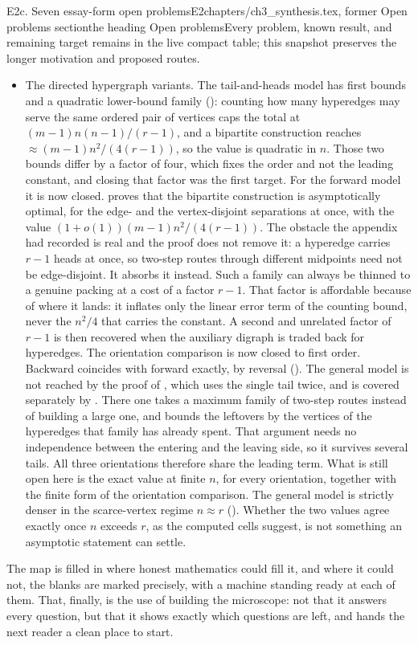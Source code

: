 \begin{offcut}{E2c. Seven essay-form open problems}{E2}{chapters/ch3\_synthesis.tex, former Open problems section}{the heading Open problems}{Every problem, known result, and remaining target remains in the live compact table; this snapshot preserves the longer motivation and proposed routes.}
\begin{itemize}
    \item The directed hypergraph variants. The tail-and-heads model has first bounds and a quadratic lower-bound family (): counting how many hyperedges may serve the same ordered pair of vertices caps the total at $(m-1)n(n-1)/(r-1)$, and a bipartite construction reaches $\approx (m-1)n^2/(4(r-1))$, so the value is quadratic in $n$. Those two bounds differ by a factor of four, which fixes the order and not the leading constant, and closing that factor was the first target. For the forward model it is now closed.  proves that the bipartite construction is asymptotically optimal, for the edge- and the vertex-disjoint separations at once, with the value $(1+o(1))(m-1)n^2/(4(r-1))$. The obstacle the appendix had recorded is real and the proof does not remove it: a hyperedge carries $r-1$ heads at once, so two-step routes through different midpoints need not be edge-disjoint. It absorbs it instead. Such a family can always be thinned to a genuine packing at a cost of a factor $r-1$. That factor is affordable because of where it lands: it inflates only the linear error term of the counting bound, never the $n^2/4$ that carries the constant. A second and unrelated factor of $r-1$ is then recovered when the auxiliary digraph is traded back for hyperedges. The orientation comparison is now closed to first order. Backward coincides with forward exactly, by reversal (). The general model is not reached by the proof of , which uses the single tail twice, and is covered separately by . There one takes a maximum family of two-step routes instead of building a large one, and bounds the leftovers by the vertices of the hyperedges that family has already spent. That argument needs no independence between the entering and the leaving side, so it survives several tails. All three orientations therefore share the leading term. What is still open here is the exact value at finite $n$, for every orientation, together with the finite form of the orientation comparison. The general model is strictly denser in the scarce-vertex regime $n \approx r$ (). Whether the two values agree exactly once $n$ exceeds $r$, as the computed cells suggest, is not something an asymptotic statement can settle.
\end{itemize}

The map is filled in where honest mathematics could fill it, and where it could not, the blanks are marked precisely, with a machine standing ready at each of them. That, finally, is the use of building the microscope: not that it answers every question, but that it shows exactly which questions are left, and hands the next reader a clean place to start.
\end{offcut}


